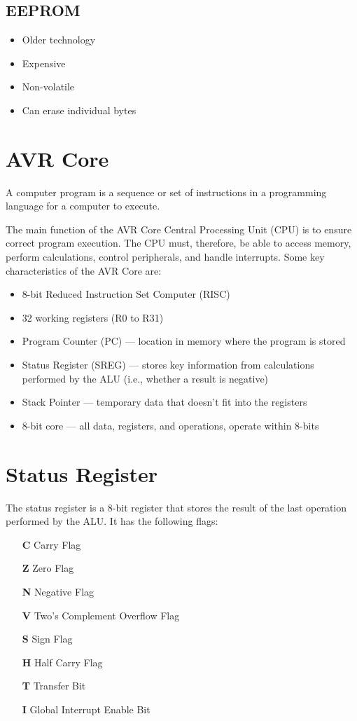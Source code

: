 \documentclass{report}
\begin{document}
\subsection{EEPROM}
\begin{itemize}
    \item Older technology
    \item Expensive
    \item Non-volatile
    \item Can erase individual bytes
\end{itemize}
\section{AVR Core}
\begin{definition}
    A computer program is a sequence or set of instructions in a programming language
    for a computer to execute.
\end{definition}
The main function of the AVR Core Central Processing Unit (CPU) is to ensure correct program execution.
The CPU must, therefore, be able to access memory, perform calculations, control peripherals, and handle interrupts.
Some key characteristics of the AVR Core are:
\begin{itemize}
    \item 8-bit Reduced Instruction Set Computer (RISC)
    \item 32 working registers (R0 to R31)
    \item Program Counter (PC) --- location in memory where the program is stored
    \item Status Register (SREG) --- stores key information from calculations performed by the ALU (i.e., whether a result is negative)
    \item Stack Pointer --- temporary data that doesn't fit into the registers
    \item 8-bit core --- all data, registers, and operations, operate within 8-bits
\end{itemize}
\section{Status Register}
The status register is a 8-bit register that stores the result of the last operation performed by the ALU.
It has the following flags:
\begin{itemize}
    \item[\textbf{C}] Carry Flag
    \item[\textbf{Z}] Zero Flag
    \item[\textbf{N}] Negative Flag
    \item[\textbf{V}] Two's Complement Overflow Flag
    \item[\textbf{S}] Sign Flag
    \item[\textbf{H}] Half Carry Flag
    \item[\textbf{T}] Transfer Bit
    \item[\textbf{I}] Global Interrupt Enable Bit
\end{itemize}
\end{document}
